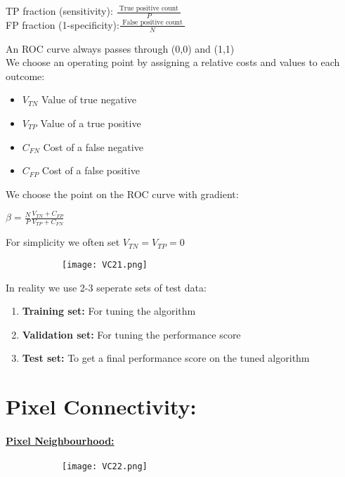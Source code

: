 \documentclass[8pt]{extreport}
\begin{document}
\begin{center}
TP fraction (sensitivity): $\frac{\text{ True positive count } }{P}$\\
FP fraction (1-specificity):$ \frac{\text{ False positive count } }{N}$
\end{center}

An ROC curve always passes through (0,0) and (1,1)\\
We choose an operating point by assigning a relative costs and values to each outcome:
\begin{itemize}
\item $V_{TN}$ Value of true negative
\item $V_{TP}$ Value of a true positive
\item $C_{FN}$ Cost of a false negative
\item $C_{FP}$ Cost of a false positive
\end{itemize}

We choose the point on the ROC curve with gradient:
\begin{center}
$\beta = \frac{N}{P}\frac{V_{TN} + C_{FP}}{V_{TP} + C_{FN}}$
\end{center}
For simplicity we often set $V_{TN} = V_{TP} = 0$
\begin{figure}[H]
\centering
\begin{subfigure}[b]{0.5\linewidth}
\texttt{[image: VC21.png]}
\end{subfigure}
\end{figure}


In reality we use 2-3 seperate sets of test data:
\begin{enumerate}
\item \textbf{Training set:} For tuning the algorithm
\item \textbf{Validation set:} For tuning the performance score
\item \textbf{Test set:} To get a final performance score on the tuned algorithm
\end{enumerate}

\section{Pixel Connectivity:}

\paragraph{\underline{Pixel Neighbourhood:}}
\begin{figure}[H]
\centering
\begin{subfigure}[b]{0.5\linewidth}
\texttt{[image: VC22.png]}
\end{subfigure}
\end{figure}
\end{document}
